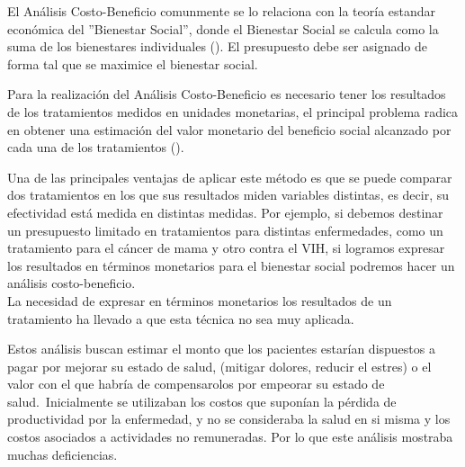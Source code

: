 \documentclass{siep}
\begin{document}
El Análisis Costo-Beneficio comunmente se lo relaciona con la teoría estandar económica del ''Bienestar Social'', donde el Bienestar Social se calcula como la suma de los bienestares individuales (\cite{gray_applied_2011}). El presupuesto debe ser asignado de forma tal que se maximice el bienestar social.\

Para la realización del Análisis Costo-Beneficio es necesario tener los resultados de los tratamientos medidos en unidades monetarias, el principal problema radica en obtener una estimación del valor monetario del beneficio social alcanzado por cada una de los tratamientos (\cite{soto_alvarez_evaluacion_2012}).\

Una de las principales ventajas de aplicar este método es que se puede comparar dos tratamientos en los que sus resultados miden variables distintas, es decir, su efectividad está medida en distintas medidas. Por ejemplo, si debemos destinar un presupuesto limitado en tratamientos para distintas enfermedades, como un tratamiento para el cáncer de mama y otro contra el VIH, si logramos expresar los resultados en términos monetarios para el bienestar social podremos hacer un análisis costo-beneficio.\\
La necesidad de expresar en términos monetarios los resultados de un tratamiento ha llevado a que esta técnica no sea muy aplicada.



Estos análisis buscan estimar el monto que los pacientes estarían dispuestos a pagar por mejorar su estado de salud, (mitigar dolores, reducir el estres) o el valor con el que habría de compensarolos por empeorar su estado de salud.\
Inicialmente se utilizaban los costos que suponían la pérdida de productividad por la enfermedad, y no se consideraba la salud en si misma y los costos asociados a actividades no remuneradas. Por lo que este análisis mostraba muchas deficiencias.
\end{document}
